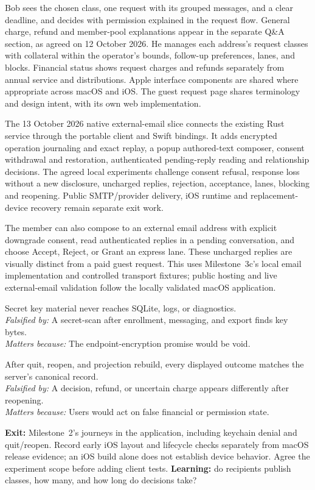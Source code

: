 \documentclass[11pt]{article}
\newenvironment{claims}{\begin{description}[leftmargin=1em,style=nextline,itemsep=0.4em]}{\end{description}}
\newcommand{\claim}[4]{\Needspace{6\baselineskip}\item[Claim (#1).] #2\\
    \textit{Falsified by:} #3\\
    \textit{Matters because:} #4}
\begin{document}
Bob sees the chosen class, one request with its grouped messages, and a clear
deadline, and decides with permission explained in the request flow. General
charge, refund and member-pool explanations appear in the separate Q\&A section,
as agreed on 12 October 2026. He
manages each address's request classes with collateral within the operator's bounds,
follow-up preferences, lanes, and blocks. Financial status shows request charges
and refunds separately from annual service and distributions. Apple interface
components are shared where appropriate across macOS and iOS. The guest request
page shares terminology and design intent, with its own web implementation.

The 13 October 2026 native external-email slice connects the existing Rust service
through the portable client and Swift bindings. It adds encrypted operation
journaling and exact replay, a popup authored-text composer, consent withdrawal and
restoration, authenticated pending-reply reading and relationship decisions. The
agreed local experiments challenge consent refusal, response loss without a new
disclosure, uncharged replies, rejection, acceptance, lanes, blocking and reopening.
Public SMTP/provider delivery, iOS runtime and replacement-device recovery remain
separate exit work.

The member can also compose to an external email address with explicit downgrade
consent, read authenticated replies in a pending conversation, and choose
Accept, Reject, or Grant an express lane. These uncharged replies are visually
distinct from a paid guest request. This uses Milestone~3c's local email
implementation and controlled transport fixtures; public hosting and live
external-email validation follow the locally validated macOS application.

\begin{claims}
\claim{integration}{Secret key material never reaches SQLite, logs, or diagnostics.}
    {A secret-scan after enrollment, messaging, and export finds key bytes.}
    {The endpoint-encryption promise would be void.}
\claim{integration}{After quit, reopen, and projection rebuild, every displayed outcome matches the server's canonical record.}
    {A decision, refund, or uncertain charge appears differently after reopening.}
    {Users would act on false financial or permission state.}
\end{claims}

\textbf{Exit:} Milestone~2's journeys in the application, including keychain
denial and quit/reopen. Record early iOS layout and lifecycle checks separately
from macOS release evidence; an iOS build alone does not establish device behavior.
Agree the experiment scope before adding client tests. \textbf{Learning:} do
recipients publish classes, how many, and how long do decisions take?
\end{document}
